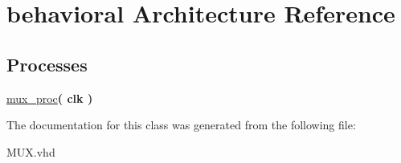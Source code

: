 \hypertarget{class_m_u_x_1_1behavioral}{\section{behavioral \-Architecture \-Reference}
\label{class_m_u_x_1_1behavioral}
}
\*
\*
\subsection*{\-Processes}
 \begin{DoxyCompactItemize}
\item 
\hypertarget{class_m_u_x_1_1behavioral_a2e0ca9ab436788ec02fcd0ed62456ade}{\hyperlink{class_m_u_x_1_1behavioral_a2e0ca9ab436788ec02fcd0ed62456ade}{mux\-\_\-proc}{\bfseries  ( {\bfseries clk  } )}}\label{class_m_u_x_1_1behavioral_a2e0ca9ab436788ec02fcd0ed62456ade}

\end{DoxyCompactItemize}


\-The documentation for this class was generated from the following file\-:\begin{DoxyCompactItemize}
\item 
\-M\-U\-X.\-vhd\end{DoxyCompactItemize}
